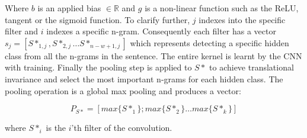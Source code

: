 Where $b$ is an applied bias $\in \mathbb{R}$ and $g$ is a non-linear function such as the ReLU, tangent or the sigmoid function. 
To clarify further, $j$ indexes into the specific filter and $i$ indexes a specific n-gram. Consequently each filter has a vector $s_j = [S*_{1,j}, S*_{2,j} \ldots S*_{n-w+1,j}]$ which represents detecting a specific hidden class from all the n-grams in the sentence. The entire kernel is learnt by the CNN with training. 
Finally the pooling step is applied to $S*$ to achieve translational invariance and select the most important n-grams for each hidden class. The pooling operation is a global max pooling and produces a vector:

$$
P_{S*} = [max\{S*_{1}\} ; max\{S*_{2}\} \ldots max\{S*_k\}]
$$

where $S*_{i}$ is the $i$'th filter of the convolution.









